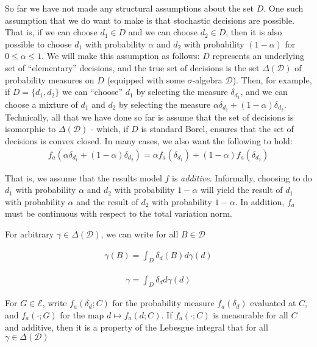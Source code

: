 So far we have not made any structural assumptions about the set $D$. One such assumption that we do want to make is that stochastic decisions are possible. That is, if we can choose $d_1\in D$ and we can choose $d_2 \in D$, then it is also possible to choose $d_1$ with probability $\alpha$ and $d_2$ with probability $(1-\alpha)$ for $0\leq \alpha \leq 1$. We will make this assumption as follows: $D$ represents an underlying set of ``elementary'' decisions, and the true set of decisions is the set $\Delta(\mathcal{D})$ of probability measures on $D$ (equipped with some $\sigma$-algebra $\mathcal{D}$). Then, for example, if $D=\{d_1,d_2\}$ we can ``choose'' $d_1$ by selecting the measure $\delta_{d_1}$, and we can choose a mixture of $d_1$ and $d_2$ by selecting the measure $\alpha \delta_{d_1}+(1-\alpha)\delta_{d_2}$. Technically, all that we have done so far is assume that the set of decisions is isomorphic to $\Delta(\mathcal{D})$ - which, if $D$ is standard Borel, ensures that the set of decisions is convex closed. In many cases, we also want the following to hold:
\begin{align}
	f_a(\alpha\delta_{d_1} + (1-\alpha)\delta_{d_2}) = \alpha f_a(\delta_{d_1}) + (1-\alpha) f_a(\delta_{d_2}) \label{eq:additivity}
\end{align}

That is, we assume that the results model $f$ is \emph{additive}. Informally, choosing to do $d_1$ with probability $\alpha$ and $d_2$ with probability $1-\alpha$ will yield the result of $d_1$ with probability $\alpha$ and the result of $d_2$ with probability $1-\alpha$. In addition, $f_a$ must be continuous with respect to the total variation norm.

For arbitrary $\gamma\in \Delta(\mathcal{D})$, we can write for all $B\in \mathcal{D}$

\begin{align}
	\gamma (B) = \int_D \delta_d(B) d\gamma(d)
\end{align}


\begin{align}
	\gamma = \int_D \delta_d d\gamma(d)
\end{align}

For $G\in \mathcal{E}$, write $f_a(\delta_d;C)$ for the probability measure $f_a(\delta_d)$ evaluated at $C$, and $f_a(\cdot;G)$ for the map $d\mapsto f_a(d;C)$. If $f_a(\cdot; C)$ is measurable for all $C$ and additive, then it is a property of the Lebesgue integral that for all $\gamma\in \Delta(\mathcal{D})$


